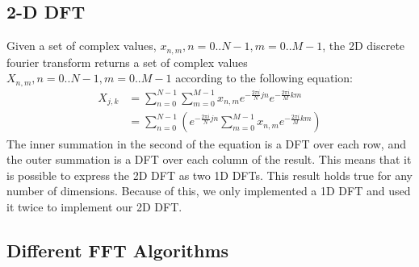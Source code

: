 \subsection{2-D DFT}
	Given a set of complex values, $x_{n,m}, n=0..N-1, m=0..M-1$, the 2D discrete fourier transform returns a set of complex values $X_{n,m}, n=0..N-1, m=0..M-1$ according to the following equation:
	\begin{align*}
		X_{j,k}&=\sum_{n=0}^{N-1}\sum_{m=0}^{M-1}x_{n,m} e^{-\frac{2\pi i}{N}jn}e^{-\frac{2\pi i}{M}km} \\
		&= \sum_{n=0}^{N-1} \left(e^{-\frac{2\pi i}{N}jn}\sum_{m=0}^{M-1}x_{n,m}e^{-\frac{2\pi i}{M}km}\right)
	\end{align*}
	The inner summation in the second of the equation is a DFT over each row, and the outer summation is a DFT over each column of the result. This means that it is possible to express the 2D DFT as two 1D DFTs. This result holds true for any number of dimensions. Because of this, we only implemented a 1D DFT and used it twice to implement our 2D DFT.
\subsection{Different FFT Algorithms}
